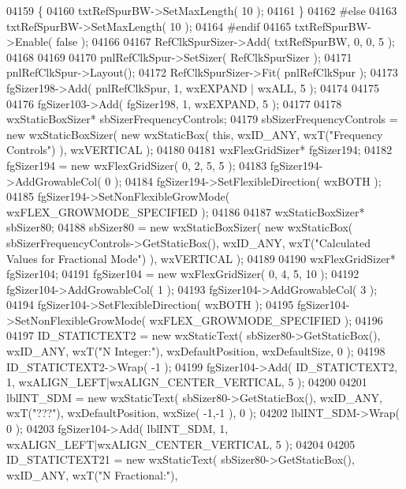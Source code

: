 \begin{DoxyCode}
04159     \{
04160     txtRefSpurBW->SetMaxLength( 10 );
04161     \}
04162 \textcolor{preprocessor}{    #else}
04163     txtRefSpurBW->SetMaxLength( 10 );
04164 \textcolor{preprocessor}{    #endif}
04165     txtRefSpurBW->Enable( \textcolor{keyword}{false} );
04166     
04167     RefClkSpurSizer->Add( txtRefSpurBW, 0, 0, 5 );
04168     
04169     
04170     pnlRefClkSpur->SetSizer( RefClkSpurSizer );
04171     pnlRefClkSpur->Layout();
04172     RefClkSpurSizer->Fit( pnlRefClkSpur );
04173     fgSizer198->Add( pnlRefClkSpur, 1, wxEXPAND | wxALL, 5 );
04174     
04175     
04176     fgSizer103->Add( fgSizer198, 1, wxEXPAND, 5 );
04177     
04178     wxStaticBoxSizer* sbSizerFrequencyControls;
04179     sbSizerFrequencyControls = \textcolor{keyword}{new} wxStaticBoxSizer( \textcolor{keyword}{new} wxStaticBox( \textcolor{keyword}{this}, wxID\_ANY, wxT(\textcolor{stringliteral}{"Frequency
       Controls"}) ), wxVERTICAL );
04180     
04181     wxFlexGridSizer* fgSizer194;
04182     fgSizer194 = \textcolor{keyword}{new} wxFlexGridSizer( 0, 2, 5, 5 );
04183     fgSizer194->AddGrowableCol( 0 );
04184     fgSizer194->SetFlexibleDirection( wxBOTH );
04185     fgSizer194->SetNonFlexibleGrowMode( wxFLEX\_GROWMODE\_SPECIFIED );
04186     
04187     wxStaticBoxSizer* sbSizer80;
04188     sbSizer80 = \textcolor{keyword}{new} wxStaticBoxSizer( \textcolor{keyword}{new} wxStaticBox( sbSizerFrequencyControls->GetStaticBox(), wxID\_ANY, 
      wxT(\textcolor{stringliteral}{"Calculated Values for Fractional Mode"}) ), wxVERTICAL );
04189     
04190     wxFlexGridSizer* fgSizer104;
04191     fgSizer104 = \textcolor{keyword}{new} wxFlexGridSizer( 0, 4, 5, 10 );
04192     fgSizer104->AddGrowableCol( 1 );
04193     fgSizer104->AddGrowableCol( 3 );
04194     fgSizer104->SetFlexibleDirection( wxBOTH );
04195     fgSizer104->SetNonFlexibleGrowMode( wxFLEX\_GROWMODE\_SPECIFIED );
04196     
04197     ID_STATICTEXT2 = \textcolor{keyword}{new} wxStaticText( sbSizer80->GetStaticBox(), wxID\_ANY, wxT(\textcolor{stringliteral}{"N Integer:"}), 
      wxDefaultPosition, wxDefaultSize, 0 );
04198     ID_STATICTEXT2->Wrap( -1 );
04199     fgSizer104->Add( ID_STATICTEXT2, 1, wxALIGN\_LEFT|wxALIGN\_CENTER\_VERTICAL, 5 );
04200     
04201     lblINT_SDM = \textcolor{keyword}{new} wxStaticText( sbSizer80->GetStaticBox(), wxID\_ANY, wxT(\textcolor{stringliteral}{"???"}), wxDefaultPosition, 
      wxSize( -1,-1 ), 0 );
04202     lblINT_SDM->Wrap( 0 );
04203     fgSizer104->Add( lblINT_SDM, 1, wxALIGN\_LEFT|wxALIGN\_CENTER\_VERTICAL, 5 );
04204     
04205     ID_STATICTEXT21 = \textcolor{keyword}{new} wxStaticText( sbSizer80->GetStaticBox(), wxID\_ANY, wxT(\textcolor{stringliteral}{"N Fractional:"}), 

\end{DoxyCode}
